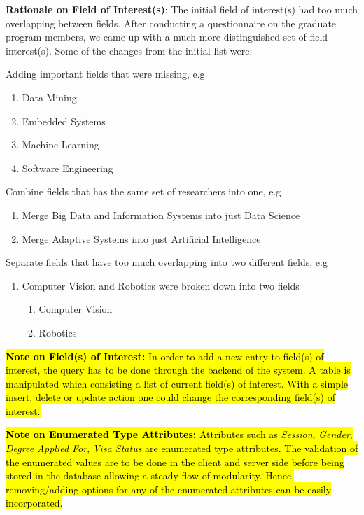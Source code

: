 \documentclass[fontsize=12pt,paper=letter,twoside]{scrartcl}
\begin{document}
\smallskip
\noindent \textbf{Rationale on Field of Interest(s)}: The initial field of interest(s) had too much overlapping between fields. After conducting a questionnaire on the graduate program members, we came up with a much more distinguished set of field interest(s). Some of the changes from the initial list were:
\begin{mylist}
\item Adding important fields that were missing, e.g
\begin{enumerate}
\item Data Mining
\item Embedded Systems
\item Machine Learning
\item Software Engineering
\end{enumerate}
\item Combine fields that has the same set of researchers into one, e.g
\begin{enumerate}
\item Merge Big Data and Information Systems into just Data Science
\item Merge Adaptive Systems into just Artificial Intelligence
\end{enumerate}
\item Separate fields that have too much overlapping into two different fields, e.g
\begin{enumerate}
\item Computer Vision and Robotics were broken down into two fields
\begin{enumerate}
\item Computer Vision
\item Robotics
\end{enumerate}
\end{enumerate}
\end{mylist}

\smallskip
\noindent \hl{\textbf{Note on Field(s) of Interest:} In order to add a new entry to field(s) of interest, the query has to be done through the backend of the system. A table is manipulated which consisting a list of current field(s) of interest. With a simple insert, delete or update action one could change the corresponding field(s) of interest.}

\smallskip
\noindent \hl{\textbf{Note on Enumerated Type Attributes:} Attributes such as \emph{Session}, \emph{Gender}, \emph{Degree Applied For}, \emph{Visa Status} are enumerated type attributes. The validation of the enumerated values are to be done in the client and server side before being stored in the database allowing a steady flow of modularity. Hence, removing/adding options for any of the enumerated attributes can be easily incorporated.}
\end{document}
